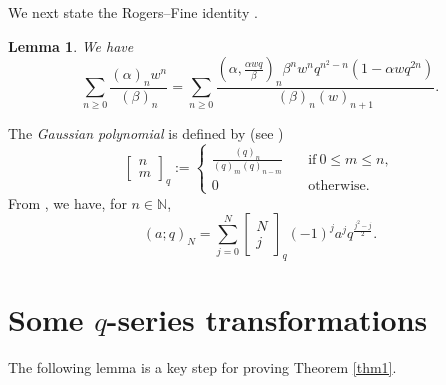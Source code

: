 \documentclass[12pt,reqno]{amsart}
\renewcommand{\a}{\alpha}
\renewcommand{\b}{\beta}
\renewcommand{\(}{\left\(}
\renewcommand{\)}{\right\)}
\numberwithin{equation}{section}
\theoremstyle{plain}
\newtheorem{lemma}[theorem]{Lemma}
\theoremstyle{definition}
\numberwithin{equation}{section}
\begin{document}
We next state the Rogers--Fine identity \cite[equation (2.7)]{A0}.
\begin{lemma}\label{RF}
	We have
	\begin{equation*}
	\sum_{n\ge 0}\frac{\left(\a\right)_nw^n}{\left(\beta\right)_n}=\sum_{n\ge 0}\frac{\left(\a,\frac{\a wq}{\b}\right)_n\b^nw^nq^{n^2-n}\left(1-\a w q^{2n}\right)}{\left(\b\right)_n\left(w\right)_{n+1}}.
	\end{equation*}
\end{lemma}


The \emph{Gaussian polynomial} is defined by (see \cite[Definition 3.1]{Andbook})
\begin{equation*}
\begin{bmatrix}
n\\m
\end{bmatrix}_q:=\begin{cases}
\frac{(q)_n}{(q)_m(q)_{n-m}} &\quad \text{if}\ 0\le m\le n,\\
0 &\quad \text{otherwise}.
\end{cases}
\end{equation*}
From \cite[equation (3.3.6)]{Andbook}, we have, for $n\in \mathbb{N}$,
\begin{equation}\label{Gaussian}
\left(a;q\right)_N=\sum_{j=0}^{N}\begin{bmatrix}
N\\
j
\end{bmatrix}_{q}(-1)^j a^j q^{\frac{j^2-j}{2}}.
\end{equation}



\section{Some $q$-series transformations}\label{sec:formulas}
The following lemma is a key step for proving Theorem \ref{thm1}.
\end{document}
